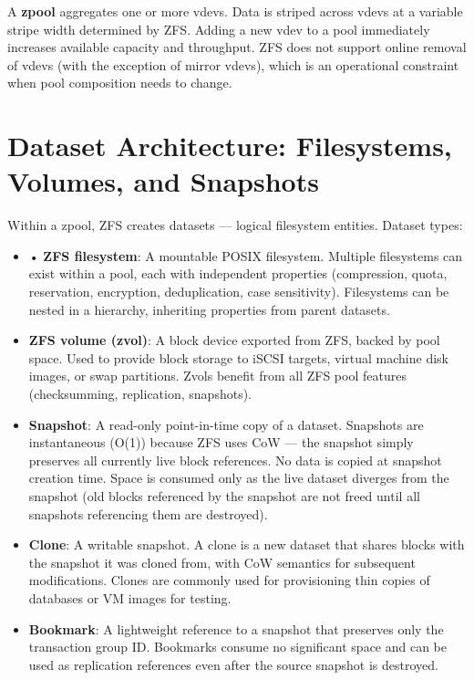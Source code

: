 A \textbf{zpool} aggregates one or more vdevs. Data is striped across vdevs at a variable stripe width determined by ZFS. Adding a new vdev to a pool immediately increases available capacity and throughput. ZFS does not support online removal of vdevs (with the exception of mirror vdevs), which is an operational constraint when pool composition needs to change.

\section{Dataset Architecture: Filesystems, Volumes, and Snapshots}
Within a zpool, ZFS creates datasets --- logical filesystem entities. Dataset types:

\begin{itemize}
  \item • \textbf{ZFS filesystem}: A mountable POSIX filesystem. Multiple filesystems can exist within a pool, each with independent properties (compression, quota, reservation, encryption, deduplication, case sensitivity). Filesystems can be nested in a hierarchy, inheriting properties from parent datasets.
  \item \textbf{ZFS volume (zvol)}: A block device exported from ZFS, backed by pool space. Used to provide block storage to iSCSI targets, virtual machine disk images, or swap partitions. Zvols benefit from all ZFS pool features (checksumming, replication, snapshots).
  \item \textbf{Snapshot}: A read-only point-in-time copy of a dataset. Snapshots are instantaneous (O(1)) because ZFS uses CoW --- the snapshot simply preserves all currently live block references. No data is copied at snapshot creation time. Space is consumed only as the live dataset diverges from the snapshot (old blocks referenced by the snapshot are not freed until all snapshots referencing them are destroyed).
  \item \textbf{Clone}: A writable snapshot. A clone is a new dataset that shares blocks with the snapshot it was cloned from, with CoW semantics for subsequent modifications. Clones are commonly used for provisioning thin copies of databases or VM images for testing.
  \item \textbf{Bookmark}: A lightweight reference to a snapshot that preserves only the transaction group ID. Bookmarks consume no significant space and can be used as replication references even after the source snapshot is destroyed.
\end{itemize}

